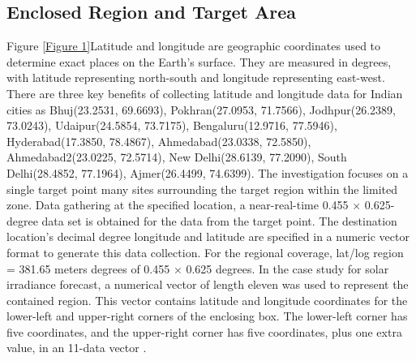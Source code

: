 \documentclass[a4paper,fleqn]{cas-sc}
\begin{document}
\subsection{Enclosed Region and Target Area}
Figure \ref{Figure 1}Latitude and longitude are geographic coordinates used to determine exact places on the Earth's surface. They are measured in degrees, with latitude representing north-south and longitude representing east-west. There are three key benefits of collecting latitude and longitude data for Indian cities as Bhuj(23.2531, 69.6693), Pokhran(27.0953, 71.7566), Jodhpur(26.2389, 73.0243), Udaipur(24.5854, 73.7175), Bengaluru(12.9716, 77.5946), Hyderabad(17.3850, 78.4867), Ahmedabad(23.0338, 72.5850), Ahmedabad2(23.0225, 72.5714), New Delhi(28.6139, 77.2090), South Delhi(28.4852, 77.1964), Ajmer(26.4499, 74.6399). The investigation focuses on a single target point many sites surrounding the target region within the limited zone. Data gathering at the specified location, a near-real-time 0.455 × 0.625-degree data set is obtained for the data from the target point. The destination location's decimal degree longitude and latitude are specified in a numeric vector format to generate this data collection. For the regional coverage, lat/log region = 381.65 meters degrees of 0.455 × 0.625 degrees. In the case study for solar irradiance forecast, a numerical vector of length eleven was used to represent the contained region. This vector contains latitude and longitude coordinates for the lower-left and upper-right corners of the enclosing box. The lower-left corner has five coordinates, and the upper-right corner has five coordinates, plus one extra value, in an 11-data vector \cite{belmahdi2020one}.
\end{document}
